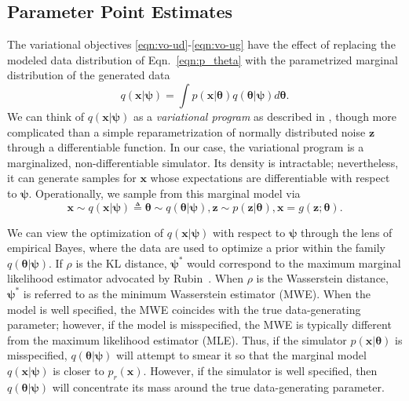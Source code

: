 \documentclass{article}
\newcommand{\qxpsi}{q(\mathbf{x}|\bfpsi)}
\newcommand{\bftheta}{{\bm \theta}}
\newcommand{\bfpsi}{{\bm \psi}}
\newcommand{\bfx}{\mathbf{x}}
\newcommand{\bfz}{\mathbf{z}}
\theoremstyle{plain}
\begin{document}
\subsection{Parameter Point Estimates}

The variational objectives \ref{eqn:vo-ud}-\ref{eqn:vo-ug}
have the effect of replacing the modeled data distribution of Eqn.~\ref{eqn:p_theta} with
the parametrized marginal distribution of the generated data
\begin{equation}\label{eq:marginal_likelihood}
\qxpsi = \int  p(\mathbf{x}|\bftheta) q(\bftheta|\bfpsi) d\bftheta.
\end{equation}
We can think of $q(\bfx|\bfpsi)$ as a \textit{variational program} as described
in \cite{2016arXiv161009033R}, though more complicated than a simple
reparametrization of normally distributed noise $\bfz$ through a differentiable
function. In our case, the variational program is a
marginalized, non-differentiable  simulator.  Its density is  intractable;
nevertheless, it can generate samples for $\bfx$ whose expectations are differentiable with
respect to $\bfpsi$.
Operationally, we sample from this marginal model via
\begin{equation}\label{eqn:p_psi}
\mathbf{x} \sim \qxpsi \triangleq \bftheta \sim q(\bftheta|\bfpsi), \bfz \sim p(\bfz|\bftheta), \mathbf{x} = g(\bfz; \bftheta).
\end{equation}

We can view the optimization of $q(\bfx | \bfpsi)$ with respect to $\bfpsi$ through the lens of empirical Bayes, where the data are used to optimize a prior within the family $q(\bftheta|\bfpsi)$. If $\rho$ is the KL distance, $\bfpsi^*$ would correspond to the maximum marginal likelihood estimator advocated by Rubin~\cite{rubin1984}.
When $\rho$ is the Wasserstein distance, $\bfpsi^*$ is referred to as the
minimum Wasserstein estimator (MWE).
When the model is well specified, the MWE
coincides with the true data-generating parameter; however, if the model is
misspecified, the MWE is typically different from the maximum likelihood
estimator (MLE).
Thus, if the simulator $p(\bfx |
\bftheta)$ is misspecified, $q(\bftheta | \bfpsi)$ will attempt to smear it so that the marginal
model $q(\bfx | \bfpsi)$ is closer to $p_r(\bfx)$. However, if the simulator is well specified,
then $q(\bftheta | \bfpsi)$ will concentrate its mass around the true data-generating parameter.
\end{document}
